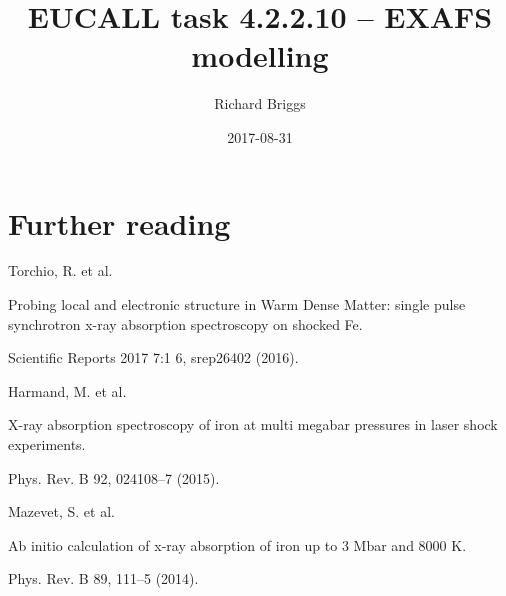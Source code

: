 \documentclass{article}
\title{}
\author{Richard Briggs}
\date{2017-08-31}
\begin{document}
\title{EUCALL task 4.2.2.10 -- EXAFS modelling}
\maketitle


\bigskip

\section{Further reading}
Torchio, R. et al.

Probing local and electronic structure in Warm Dense Matter: single pulse
synchrotron x-ray absorption spectroscopy on shocked Fe.

Scientific Reports 2017 7:1 6, srep26402 (2016).


\bigskip

Harmand, M. et al.

X-ray absorption spectroscopy of iron at multi megabar pressures in laser shock
experiments.

Phys. Rev. B 92, 024108--7 (2015).


\bigskip

Mazevet, S. et al.

Ab initio calculation of x-ray absorption of iron up to 3 Mbar and 8000 K.

Phys. Rev. B 89, 111--5 (2014).


\bigskip


\bigskip
\end{document}
